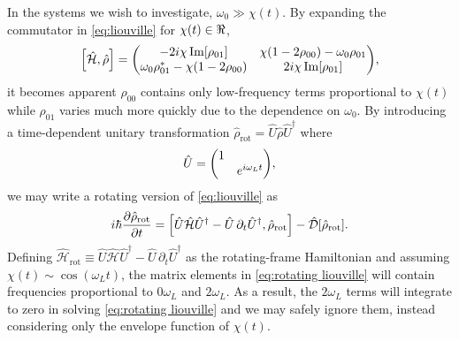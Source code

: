 \documentclass[conference]{IEEEtran}
\begin{document}
In the systems we wish to investigate, $\omega_0 \gg \chi(t)$. By expanding the commutator in \cref{eq:liouville} for $\chi(t) \in \real$,
\begin{equation}
  \commutator{\hat{\mathcal{H}}}{\hat{\rho}} =
  \mqty(
    -2 i \chi \Im[\rho_{01}] & \chi\qty(1 - 2 \rho_{00}) - \omega_0 \rho_{01} \\ 
    \omega_0 \rho_{01}^* - \chi\qty(1 - 2\rho_{00}) & 2 i \chi \Im[\rho_{01}]
  ),
\end{equation}
it becomes apparent $\rho_{00}$ contains only low-frequency terms proportional to $\chi(t)$ while $\rho_{01}$ varies much more quickly due to the dependence on $\omega_0$.
By introducing a time-dependent unitary transformation $\hat{\rho}_\text{rot} = \hat{U}\hat{\rho}\hat{U}^\dagger$ where
\begin{equation}
  \hat{U} = \mqty(\dmat{1, e^{i \omega_L t}}), 
  \label{eq:unitary transformation}
\end{equation}
we may write a rotating version of \cref{eq:liouville} as
\begin{equation}
  i \hbar \pdv{\hat{\rho}_\text{rot}}{t} = \commutator{\hat{U} \hat{\mathcal{H}} \hat{U}^\dagger - \hat{U} \, \partial_t \hat{U}^\dagger}{\hat{\rho}_\text{rot}} - \hat{\mathcal{D}}[\hat{\rho}_\text{rot}].
  \label{eq:rotating liouville}
\end{equation}
Defining $\hat{\mathcal{H}}_\text{rot} \equiv \hat{U} \hat{\mathcal{H}} \hat{U}^\dagger - \hat{U} \, \partial_t \hat{U}^\dagger$ as the rotating-frame Hamiltonian and assuming $\chi(t) \sim \cos(\omega_L t)$, the matrix elements in \cref{eq:rotating liouville} will contain frequencies proportional to $0\omega_L$ and $2\omega_L$.
As a result, the $2\omega_L$ terms will integrate to zero in solving \cref{eq:rotating liouville} and we may safely ignore them, instead considering only the envelope function of $\chi(t)$.
\end{document}
